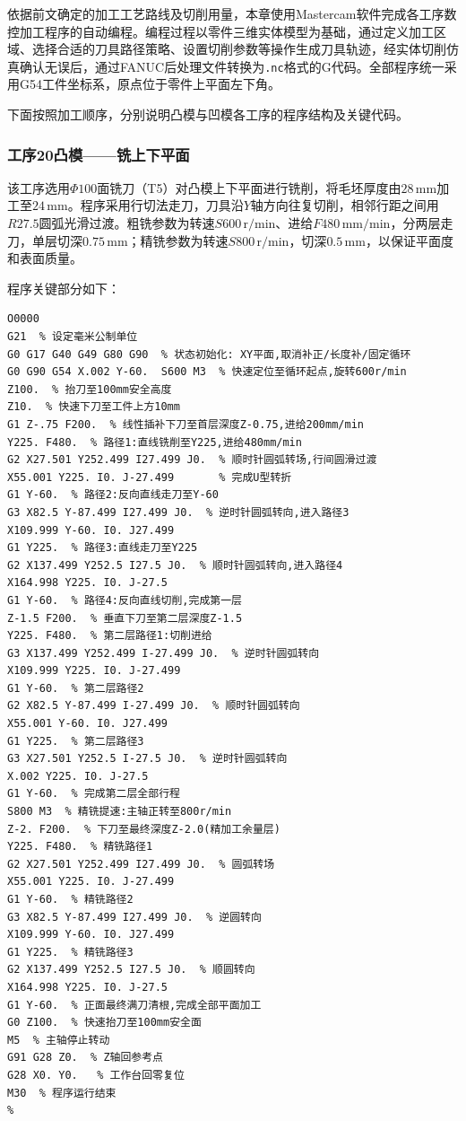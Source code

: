 \documentclass{xautCADreport}
\begin{document}
依据前文确定的加工工艺路线及切削用量，本章使用Mastercam软件\cite{ref:ge2015,ref:wang2016}完成各工序数控加工程序的自动编程。编程过程以零件三维实体模型为基础，通过定义加工区域、选择合适的刀具路径策略、设置切削参数等操作生成刀具轨迹，经实体切削仿真确认无误后，通过FANUC后处理文件转换为\texttt{.nc}格式的G代码。全部程序统一采用G54工件坐标系，原点位于零件上平面左下角。

下面按照加工顺序，分别说明凸模与凹模各工序的程序结构及关键代码。

\subsubsection{工序20凸模——铣上下平面}

该工序选用$\Phi100$面铣刀（T5）对凸模上下平面进行铣削，将毛坯厚度由$28\,\mathrm{mm}$加工至$24\,\mathrm{mm}$。程序采用行切法走刀，刀具沿$Y$轴方向往复切削，相邻行距之间用$R27.5$圆弧光滑过渡。粗铣参数为转速$S600\,\mathrm{r/min}$、进给$F480\,\mathrm{mm/min}$，分两层走刀，单层切深$0.75\,\mathrm{mm}$；精铣参数为转速$S800\,\mathrm{r/min}$，切深$0.5\,\mathrm{mm}$，以保证平面度和表面质量。

程序关键部分如下：

\begin{lstlisting}[caption={工序20凸模铣平面程序（完整程序）}]
%
O0000
G21  % 设定毫米公制单位
G0 G17 G40 G49 G80 G90  % 状态初始化: XY平面,取消补正/长度补/固定循环
G0 G90 G54 X.002 Y-60.  S600 M3  % 快速定位至循环起点,旋转600r/min
Z100.  % 抬刀至100mm安全高度
Z10.  % 快速下刀至工件上方10mm
G1 Z-.75 F200.  % 线性插补下刀至首层深度Z-0.75,进给200mm/min
Y225. F480.  % 路径1:直线铣削至Y225,进给480mm/min
G2 X27.501 Y252.499 I27.499 J0.  % 顺时针圆弧转场,行间圆滑过渡
X55.001 Y225. I0. J-27.499       % 完成U型转折
G1 Y-60.  % 路径2:反向直线走刀至Y-60
G3 X82.5 Y-87.499 I27.499 J0.  % 逆时针圆弧转向,进入路径3
X109.999 Y-60. I0. J27.499
G1 Y225.  % 路径3:直线走刀至Y225
G2 X137.499 Y252.5 I27.5 J0.  % 顺时针圆弧转向,进入路径4
X164.998 Y225. I0. J-27.5
G1 Y-60.  % 路径4:反向直线切削,完成第一层
Z-1.5 F200.  % 垂直下刀至第二层深度Z-1.5
Y225. F480.  % 第二层路径1:切削进给
G3 X137.499 Y252.499 I-27.499 J0.  % 逆时针圆弧转向
X109.999 Y225. I0. J-27.499
G1 Y-60.  % 第二层路径2
G2 X82.5 Y-87.499 I-27.499 J0.  % 顺时针圆弧转向
X55.001 Y-60. I0. J27.499
G1 Y225.  % 第二层路径3
G3 X27.501 Y252.5 I-27.5 J0.  % 逆时针圆弧转向
X.002 Y225. I0. J-27.5
G1 Y-60.  % 完成第二层全部行程
S800 M3  % 精铣提速:主轴正转至800r/min
Z-2. F200.  % 下刀至最终深度Z-2.0(精加工余量层)
Y225. F480.  % 精铣路径1
G2 X27.501 Y252.499 I27.499 J0.  % 圆弧转场
X55.001 Y225. I0. J-27.499
G1 Y-60.  % 精铣路径2
G3 X82.5 Y-87.499 I27.499 J0.  % 逆圆转向
X109.999 Y-60. I0. J27.499
G1 Y225.  % 精铣路径3
G2 X137.499 Y252.5 I27.5 J0.  % 顺圆转向
X164.998 Y225. I0. J-27.5
G1 Y-60.  % 正面最终满刀清根,完成全部平面加工
G0 Z100.  % 快速抬刀至100mm安全面
M5  % 主轴停止转动
G91 G28 Z0.  % Z轴回参考点
G28 X0. Y0.   % 工作台回零复位
M30  % 程序运行结束
%
\end{lstlisting}
\end{document}
